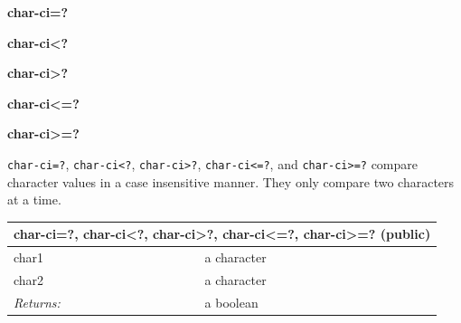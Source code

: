 \documentclass[twoside,9pt]{report}
\begin{document}
\textbf{char-ci=?}


\textbf{char-ci<?}


\textbf{char-ci>?}


\textbf{char-ci<=?}


\textbf{char-ci>=?}


\texttt{char-ci=?}, \texttt{char-ci<?}, \texttt{char-ci>?}, \texttt{char-ci<=?}, and \texttt{char-ci>=?} compare character values in a case insensitive manner. They only compare two characters at a time.

\begin{tabular}{ |l l| }
\hline
\multicolumn{2}{|l|}{char-ci=?, char-ci<?, char-ci>?, char-ci<=?, char-ci>=? (public)} \\
\hline
char1 & a character \\
char2 & a character \\
\textit{Returns:} & a boolean \\
\hline
\end{tabular}
\end{document}
